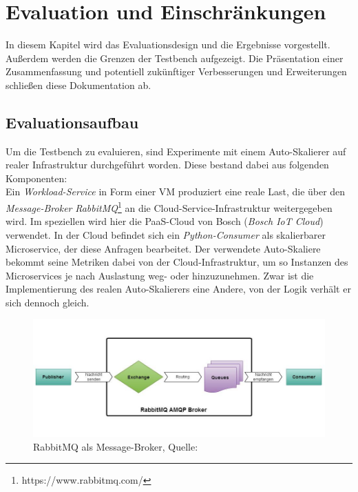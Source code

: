 \chapter{Evaluation und Einschränkungen}
\label{ch:Evaluation}
In diesem Kapitel wird das Evaluationsdesign und die Ergebnisse vorgestellt. Außerdem werden die Grenzen der Testbench aufgezeigt. Die Präsentation einer Zusammenfassung und potentiell zukünftiger Verbesserungen und Erweiterungen schließen diese Dokumentation ab.



\section{Evaluationsaufbau}
\label{sec:Evaluation:Aufbau}
Um die Testbench zu evaluieren, sind Experimente mit einem Auto-Skalierer auf realer Infrastruktur durchgeführt worden. Diese bestand dabei aus folgenden Komponenten: \\
Ein \textit{Workload-Service} in Form einer VM produziert eine reale Last, die über den \textit{Message-Broker} \textit{RabbitMQ}\footnote{https://www.rabbitmq.com/} an die Cloud-Service-Infrastruktur weitergegeben wird. Im speziellen wird hier die PaaS-Cloud von Bosch (\textit{Bosch IoT Cloud}) verwendet. In der Cloud befindet sich ein \textit{Python-Consumer} als skalierbarer Microservice, der diese Anfragen bearbeitet. Der verwendete Auto-Skaliere bekommt seine Metriken dabei von der Cloud-Infrastruktur, um so Instanzen des Microservices je nach Auslastung weg- oder hinzuzunehmen. Zwar ist die Implementierung des realen Auto-Skalierers eine Andere, von der Logik verhält er sich dennoch gleich.


\begin{figure}[!h]
	\centering
	\includegraphics[width=13cm, trim={0cm 1.3cm 0cm 0.8cm}]{img/rabbitmq.jpg}
	\caption{RabbitMQ als Message-Broker, Quelle: \cite{rabbit}}
	\label{fig:rabbit}
\end{figure}


